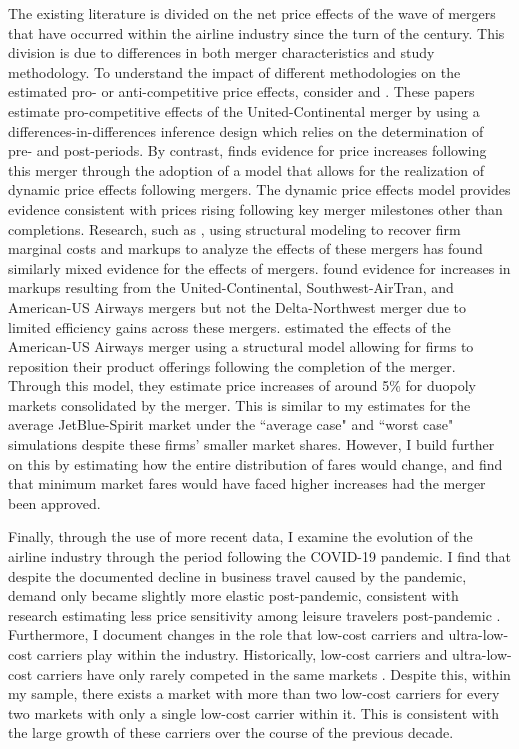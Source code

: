\documentclass{article}
\begin{document}
    The existing literature is divided on the net price effects of the wave of mergers that have occurred within the airline industry since the turn of the century. This division is due to differences in both merger characteristics and study methodology. To understand the impact of different methodologies on the estimated pro- or anti-competitive price effects, consider \citet{luo_price_2014} and \citet{carlton_are_2019}. These papers estimate pro-competitive effects of the United-Continental merger by using a differences-in-differences inference design which relies on the determination of pre- and post-periods. By contrast, \citet{fan_when_2020} finds evidence for price increases following this merger through the adoption of a model that allows for the realization of dynamic price effects following mergers. The dynamic price effects model provides evidence consistent with prices rising following key merger milestones other than completions. Research, such as \citet{bet_retrospective_2021, ciliberto_market_2021}, using structural modeling to recover firm marginal costs and markups to analyze the effects of these mergers has found similarly mixed evidence for the effects of mergers. \citet{bet_retrospective_2021} found evidence for increases in markups resulting from the United-Continental, Southwest-AirTran, and American-US Airways mergers but not the Delta-Northwest merger due to limited efficiency gains across these mergers. \citet{ciliberto_market_2021} estimated the effects of the American-US Airways merger using a structural model allowing for firms to reposition their product offerings following the completion of the merger. Through this model, they estimate price increases of around 5\% for duopoly markets consolidated by the merger. This is similar to my estimates for the average JetBlue-Spirit market under the ``average case" and ``worst case" simulations despite these firms' smaller market shares. However, I build further on this by estimating how the entire distribution of fares would change, and find that minimum market fares would have faced higher increases had the merger been approved. %


    Finally, through the use of more recent data, I examine the evolution of the airline industry through the period following the COVID-19 pandemic. I find that despite the documented decline in business travel caused by the pandemic, demand only became slightly more elastic post-pandemic, consistent with research estimating less price sensitivity among leisure travelers post-pandemic \citep{ewen_zoom_2023}. Furthermore, I document changes in the role that low-cost carriers and ultra-low-cost carriers play within the industry. Historically, low-cost carriers and ultra-low-cost carriers have only rarely competed in the same markets \citep{ciliberto_market_2021}. Despite this, within my sample, there exists a market with more than two low-cost carriers for every two markets with only a single low-cost carrier within it. This is consistent with the large growth of these carriers over the course of the previous decade.
    
\end{document}
